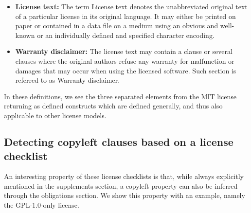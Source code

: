\begin{itemize}
	\item \textbf{License text:} The term License text denotes the unabbreviated original text of a particular license in its original language. It may either be printed on paper or contained in a data file on a medium using an obvious and well-known or an individually defined and specified character encoding.
	\item \textbf{Warranty disclaimer:} The license text may contain a clause or several clauses where the original authors refuse any warranty for malfunction or damages that may occur when using the licensed software. Such section is referred to as Warranty disclaimer.
\end{itemize}

In these definitions, we see the three separated elements from the MIT license returning as defined constructs which are defined generally, and thus also applicable to other license models.

\subsection{Detecting copyleft clauses based on a license checklist}\label{sec:detect-copyleft-from-license-checklist}

An interesting property of these license checklists is that, while always explicitly mentioned in the supplements section, a copyleft property can also be inferred through the obligations section. We show this property with an example, namely the GPL-1.0-only license.


